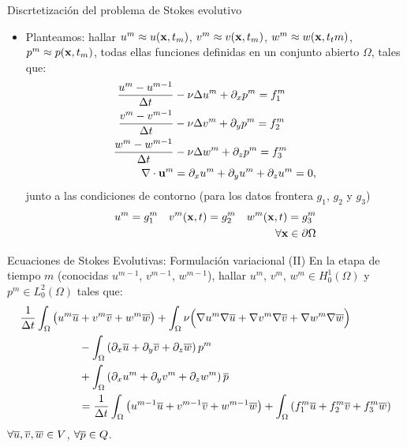 \documentclass[8pt]{beamer}
\begin{document}
\begin{frame}{Discrtetización del problema de Stokes evolutivo}

  \begin{itemize}

  \item Planteamos: hallar $u^m\approx u(\mathbf{x},t_m)$, $v^m\approx v(\mathbf{x},t_m)$, $w^m\approx w(\mathbf{x},t_tm)$, $p^m\approx p(\mathbf{x},t_m)$, todas ellas funciones definidas en un conjunto
    abierto $\Omega$, tales que:
    \begin{align}
      \frac{u^m - u^{m-1}}{\Delta t} &- \nu\Delta u^m + \partial_x p^m = f^m_1
      \\
      \frac{v^m - v^{m-1}}{\Delta t} &- \nu\Delta v^m + \partial_y p^m = f^m_2
      \\
      \frac{w^m - w^{m-1}}{\Delta t} &- \nu\Delta w^m + \partial_z p^m = f^m_3
      \\
      \nabla\cdot{}\mathbf{u}^m &= \partial_x u^m + \partial_y u^m + \partial_z u^m = 0,
    \end{align}
    junto a las condiciones de contorno (para los datos frontera $g_1$, $g_2$ y $g_3$)
    \begin{align}
      u^m=g_1^m
      \quad
      v^m(\mathbf{x},t)=g_2^m
      \quad
      w^m(\mathbf{x},t)=g_3^m
      \\
    \forall \mathbf{x}\in\partial\Omega
    \end{align}
  \end{itemize}

\end{frame}

\begin{frame}{Ecuaciones de Stokes Evolutivas: Formulación variacional (II)}
  En la etapa de tiempo $m$ (conocidas $u^{m-1}$, $v^{m-1}$, $w^{m-1}$), hallar $u^m$, $v^m$, $w^m \in H^1_0(\Omega)$ y $p^m\in L_0^2(\Omega)$ tales que:
    \begin{align*}
      \frac{1}{\Delta t} \int_\Omega\big(
      u^m \overline u
      &+ {v^m} \overline v
      + {w^m} \overline w
      \big)
      + \int_\Omega \nu\Big( \nabla u^m \nabla \overline u +
      \nabla v^m\nabla \overline v + \nabla w^m\nabla \overline w \Big)
      \\
      &- \int_\Omega \left( \partial_x \overline u + \partial_y \overline v + \partial_z \overline w \right) p^m
      \\
      &+ \int_\Omega \left( \partial_x u^m + \partial_y v^m  + \partial_z w^m \right) \overline {p}
      \\
      &=
      \frac{1}{\Delta t} \int_\Omega\big(
      u^{m-1} \overline u
      + {v^{m-1}} \overline v
      + {w^{m-1}} \overline w
      \big)
       + \int_\Omega \left( f^m_1 \overline u + f^m_2 \overline v + f^m_3 \overline w \right)
    \end{align*}
    $\forall \overline u,\overline v, \overline w\in V$, $\forall\overline {p}\in Q$.

\end{frame}
\end{document}
